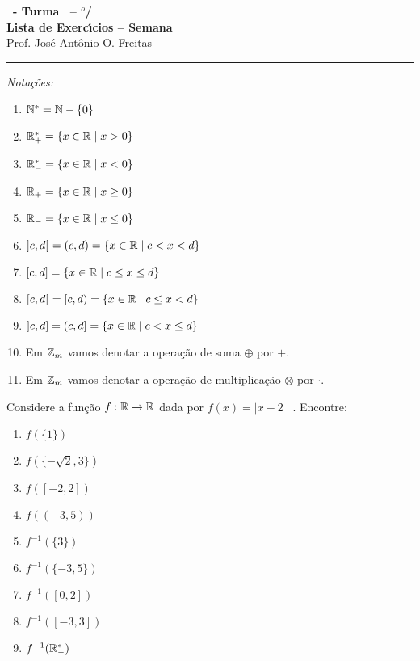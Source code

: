 \documentclass[12pt]{exam}
\begin{document}
    \begin{center}
    {\Large\bf \disciplina\ - Turma \turma\ -- \semestre$^{o}$/\ano} \\ \vspace{9pt} {\large\bf
        Lista de Exerc{\'\i}cios -- Semana \numerosemana}\\ \vspace{9pt} Prof. Jos{\'e} Ant{\^o}nio O. Freitas
    \end{center}
    \hrule

    \vspace{.6cm}

    \begin{center}
    \textit{Nota\c{c}\~oes:}
\end{center}
\begin{multicols}{2}
    \begin{enumerate}[label={\roman*})]
        \item $\mathbb{N}^* = \mathbb{N} - \{0\}$
        \item $\mathbb{R}^*_+ = \{x \in \mathbb{R} \mid x > 0\}$
        \item $\mathbb{R}^*_- = \{x \in \mathbb{R} \mid x < 0\}$
        \item $\mathbb{R}_+ = \{x \in \mathbb{R} \mid x \ge 0\}$
        \item $\mathbb{R}_- = \{x \in \mathbb{R} \mid x \le 0\}$
        \item $]c,d[\ = (c,d) = \{x \in \mathbb{R} \mid c < x < d\}$
        \item $[c,d] = \{x \in \mathbb{R} \mid c \le x \le d\}$
        \item $[c,d[\ = [c, d) = \{x \in \mathbb{R} \mid c \le x < d\}$
        \item $]c,d] = (c, d] = \{x \in \mathbb{R} \mid c < x \le d\}$
        \item Em $\mathbb{Z}_m$ vamos denotar a opera\c{c}\~ao de soma $\oplus$ por $+$.
        \item Em $\mathbb{Z}_m$ vamos denotar a opera\c{c}\~ao de multiplica\c{c}\~ao $\otimes$ por $\cdot$.
    \end{enumerate}
\end{multicols}

\vspace{.6cm}

\questao{} Considere a fun\c{c}\~ao $f : \mathbb{R} \to \mathbb{R}$ dada por $f(x) = \mid x - 2\mid$. Encontre:
\begin{multicols}{3}
    \begin{enumerate}[label={\alph*})]
        \item $f(\{1\})$
        \item $f(\{-\sqrt{2}, 3\})$
        \item $f([-2,2])$
        \item $f((-3,5))$
        \item $f^{-1}(\{3\})$
        \item $f^{-1}(\{-3,5\})$
        \item $f^{-1}([0,2])$
        \item $f^{-1}([-3,3])$
        \item $f^{-1}(\mathbb{R}^*_-)$
    \end{enumerate}
\end{multicols}
\end{document}
